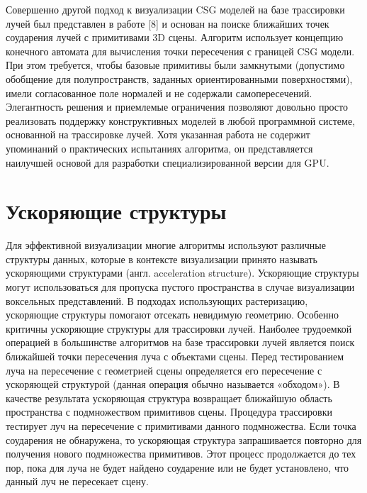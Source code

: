 Совершенно другой подход к визуализации CSG моделей  на базе трассировки лучей был представлен в работе [8] и основан на поиске ближайших точек соударения лучей с  примитивами 3D сцены. Алгоритм использует концепцию конечного автомата для вычисления точки пересечения с границей CSG модели. При этом требуется, чтобы базовые примитивы были замкнутыми (допустимо обобщение для полупространств, заданных ориентированными поверхностями), имели согласованное поле нормалей и не содержали самопересечений. Элегантность решения и приемлемые ограничения позволяют довольно просто реализовать поддержку конструктивных моделей в любой программной системе, основанной на трассировке лучей. Хотя указанная работа не содержит упоминаний о практических испытаниях алгоритма, он представляется наилучшей основой для разработки специализированной версии для GPU.

\section{Ускоряющие структуры} \label{sect_acceleration_structures}

Для эффективной визуализации многие алгоритмы используют различные структуры данных, которые в контексте визуализации принято называть ускоряющими структурами (англ. acceleration structure). Ускоряющие структуры могут использоваться для пропуска пустого пространства в случае визуализации воксельных представлений. В подходах использующих растеризацию, ускоряющие структуры помогают отсекать невидимую геометрию. Особенно критичны ускоряющие структуры для трассировки лучей. Наиболее трудоемкой операцией в большинстве алгоритмов на базе трассировки лучей является поиск ближайшей точки пересечения луча с объектами сцены. Перед тестированием луча на пересечение с геометрией сцены определяется его пересечение с ускоряющей структурой (данная операция обычно называется «обходом»). В качестве результата ускоряющая структура возвращает ближайшую область пространства с подмножеством примитивов сцены. Процедура трассировки тестирует луч на пересечение с примитивами данного подмножества. Если точка соударения не обнаружена, то ускоряющая структура запрашивается повторно для получения нового подмножества примитивов. Этот процесс продолжается до тех пор, пока для луча не будет найдено соударение или не будет установлено, что данный луч не пересекает сцену.

